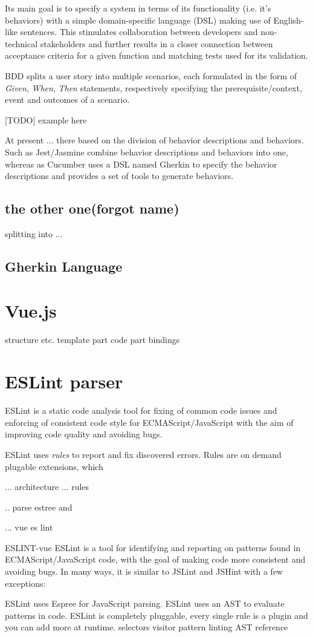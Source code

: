 Its main goal is to specify a system in terms of its functionality (i.e. it's behaviors) with a simple domain-specific language (DSL) making use of English-like sentences. This stimulates collaboration between developers and non-technical stakeholders and further results in a closer connection between acceptance criteria for a given function and matching tests used for its validation.

BDD splits a user story into multiple scenarios, each formulated in the form of \textit{Given}, \textit{When}, \textit{Then} statements, respectively specifying the prerequisite/context, event and outcomes of a scenario. 

[TODO] example here

At present ... there based on the division of behavior descriptions and behaviors. Such as Jest/Jasmine combine behavior descriptions and behaviors into one, whereas as Cucumber uses a DSL named Gherkin to specify the behavior descriptions and provides a set of tools to generate behaviors.


 \subsection{the other one(forgot name)}
 splitting into ...
\subsection{Gherkin Language}
\section{Vue.js}
structure etc.
template part
code part
bindings

\section{ESLint parser}

ESLint \parencite{eslintMainPage} is a static code analysis tool for fixing of common code issues and enforcing of consistent code style for ECMAScript/JavaScript with the aim of improving code quality and avoiding bugs.


ESLint uses \textit{rules} to report and fix discovered errors. Rules are on demand plugable extensions, which 


... architecture 
... rules


.. parse estree and 

... vue es lint

ESLINT-vue
ESLint is a tool for identifying and reporting on patterns found in ECMAScript/JavaScript code, with the goal of making code more consistent and avoiding bugs. In many ways, it is similar to JSLint and JSHint with a few exceptions:

    ESLint uses Espree for JavaScript parsing.
    ESLint uses an AST to evaluate patterns in code.
    ESLint is completely pluggable, every single rule is a plugin and you can add more at runtime.
selectors
visitor pattern
linting
AST reference
